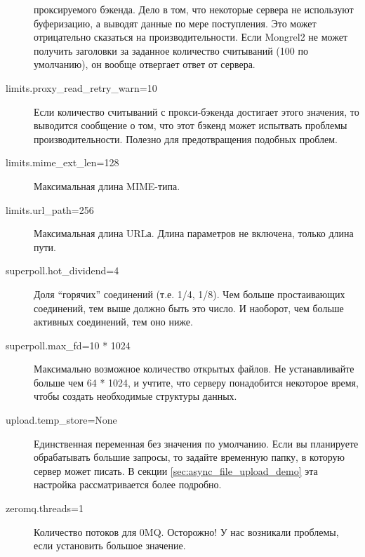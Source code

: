 \begin{description}
проксируемого бэкенда. Дело в том, что некоторые сервера не используют
буферизацию, а выводят данные по мере поступления. Это может отрицательно
сказаться на производительности. Если Mongrel2 не может получить заголовки за
заданное количество считываний (100 по умолчанию), он вообще отвергает ответ от
сервера.
\item[limits.proxy\_read\_retry\_warn=10] Если количество считываний с
прокси-бэкенда достигает этого значения, то выводится сообщение о том, что этот
бэкенд может испытвать проблемы производительности. Полезно для предотвращения
подобных проблем.
\item[limits.mime\_ext\_len=128] Максимальная длина MIME-типа.
\item[limits.url\_path=256] Максимальная длина URLа. Длина параметров
не включена, только длина пути.
\item[superpoll.hot\_dividend=4] Доля ``горячих'' соединений (т.е.
1/4, 1/8). Чем больше простаивающих соединений, тем выше должно быть
это число. И наоборот, чем больше активных соединений, тем оно ниже.
\item[superpoll.max\_fd=10 * 1024] Максимально возможное количество
открытых файлов. Не устанавливайте больше чем 64 * 1024, и учтите, что
серверу понадобится некоторое время, чтобы создать необходимые
структуры данных.
\item[upload.temp\_store=None] Единственная переменная без значения по
умолчанию. Если вы планируете обрабатывать большие запросы, то задайте
временную папку, в которую сервер может писать. В секции
\ref{sec:async_file_upload_demo} эта настройка рассматривается более подробно.
\item[zeromq.threads=1] Количество потоков для 0MQ. Осторожно! У нас
возникали проблемы, если установить большое значение.
\end{description}

